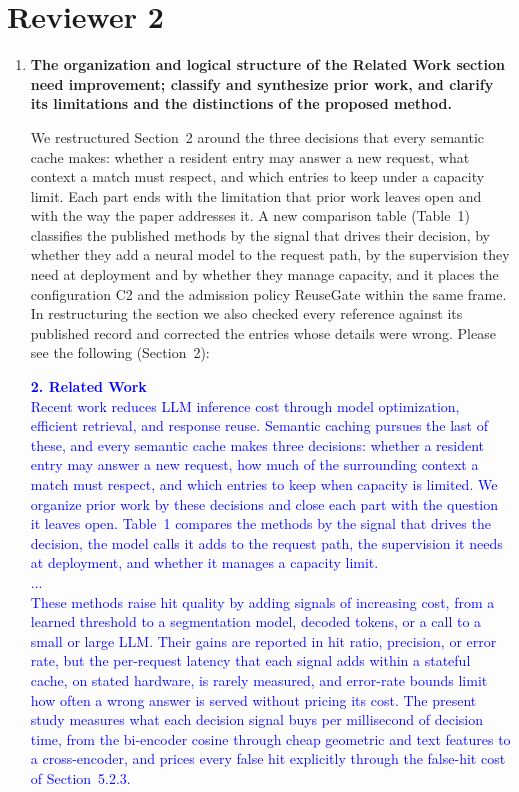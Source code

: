 \documentclass[11pt]{article}
\begin{document}
\section*{Reviewer 2}

\begin{enumerate}[leftmargin=*, itemsep=1.2em]

\item \textbf{The organization and logical structure of the Related Work section need improvement; classify and synthesize prior work, and clarify its limitations and the distinctions of the proposed method.}

We restructured Section~2 around the three decisions that every semantic cache makes: whether a resident entry may answer a new request, what context a match must respect, and which entries to keep under a capacity limit. Each part ends with the limitation that prior work leaves open and with the way the paper addresses it. A new comparison table (Table~1) classifies the published methods by the signal that drives their decision, by whether they add a neural model to the request path, by the supervision they need at deployment and by whether they manage capacity, and it places the configuration C2 and the admission policy ReuseGate within the same frame. In restructuring the section we also checked every reference against its published record and corrected the entries whose details were wrong. Please see the following (Section~2):

\textcolor{blue}{\textbf{2. Related Work}\\
Recent work reduces LLM inference cost through model optimization, efficient retrieval, and response reuse. Semantic caching pursues the last of these, and every semantic cache makes three decisions: whether a resident entry may answer a new request, how much of the surrounding context a match must respect, and which entries to keep when capacity is limited. We organize prior work by these decisions and close each part with the question it leaves open. Table~1 compares the methods by the signal that drives the decision, the model calls it adds to the request path, the supervision it needs at deployment, and whether it manages a capacity limit.\\
...\\
These methods raise hit quality by adding signals of increasing cost, from a learned threshold to a segmentation model, decoded tokens, or a call to a small or large LLM. Their gains are reported in hit ratio, precision, or error rate, but the per-request latency that each signal adds within a stateful cache, on stated hardware, is rarely measured, and error-rate bounds limit how often a wrong answer is served without pricing its cost. The present study measures what each decision signal buys per millisecond of decision time, from the bi-encoder cosine through cheap geometric and text features to a cross-encoder, and prices every false hit explicitly through the false-hit cost of Section~5.2.3.}


\end{enumerate}
\end{document}
